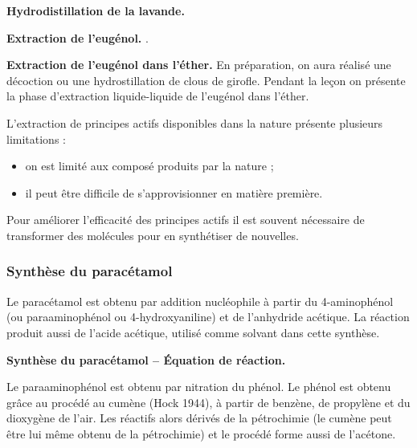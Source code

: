 \begin{slide}
\textbf{Hydrodistillation de la lavande.}
\end{slide}

\begin{slide}
\textbf{Extraction de l'eugénol.}
\cite{Prevost2017}.
\end{slide}

\begin{experience}
\textbf{Extraction de l'eugénol dans l'éther.}
En préparation, on aura réalisé une décoction ou une hydrostillation de clous de girofle.
Pendant la leçon on présente la phase d'extraction liquide-liquide de l'eugénol dans l'éther.
\end{experience}

\begin{transition}
L'extraction de principes actifs disponibles dans la nature présente plusieurs limitations :
\begin{itemize}
\item on est limité aux composé produits par la nature ;
\item il peut être difficile de s'approvisionner en matière première.
\end{itemize}
Pour améliorer l'efficacité des principes actifs il est souvent nécessaire de transformer des molécules pour en synthétiser de nouvelles.
\end{transition}

\subsubsection{Synthèse du paracétamol}

Le paracétamol est obtenu par addition nucléophile à partir du 4-aminophénol (ou paraaminophénol ou 4-hydroxyaniline) et de l'anhydride acétique.
La réaction produit aussi de l'acide acétique, utilisé comme solvant dans cette synthèse.

\begin{slide}
\textbf{Synthèse du paracétamol -- Équation de réaction.}
\end{slide}

\begin{remarque}
Le paraaminophénol est obtenu par nitration du phénol.
Le phénol est obtenu grâce au procédé au cumène (Hock 1944), à partir de benzène, de propylène et du dioxygène de l'air.
Les réactifs alors dérivés de la pétrochimie (le cumène peut être lui même obtenu de la pétrochimie) et le procédé forme aussi de l'acétone.
\end{remarque}


